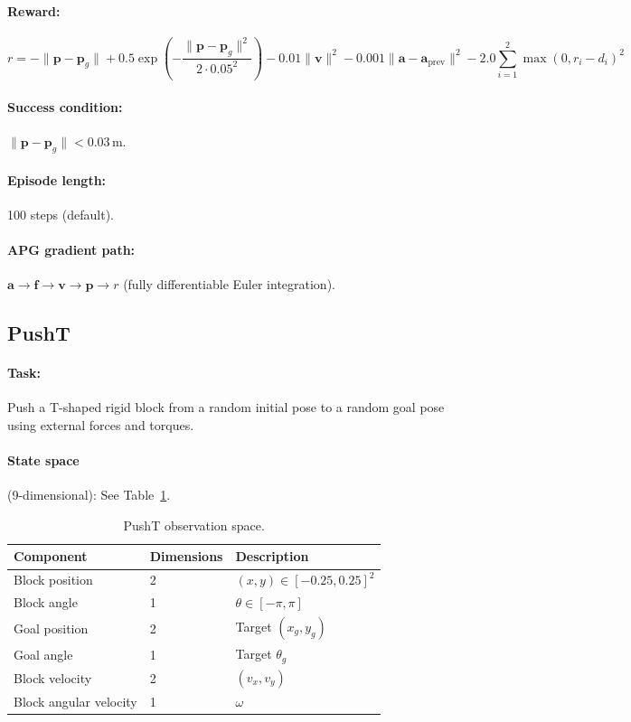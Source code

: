 \documentclass[11pt,a4paper]{article}
\newcommand{\bvf}{\mathbf{v}}
\newcommand{\bpf}{\mathbf{p}}
\newcommand{\bff}{\mathbf{f}}
\newcommand{\ba}{\mathbf{a}}
\begin{document}
\paragraph{Reward:}
\begin{equation}
  r = -\|\bpf - \bpf_g\| + 0.5\exp\!\left(-\frac{\|\bpf - \bpf_g\|^2}{2 \cdot 0.05^2}\right) - 0.01\|\bvf\|^2 - 0.001\|\ba - \ba_{\text{prev}}\|^2 - 2.0 \sum_{i=1}^{2} \max(0, r_i - d_i)^2
  \label{eq:pm_reward}
\end{equation}

\paragraph{Success condition:} $\|\bpf - \bpf_g\| < 0.03$\,m.

\paragraph{Episode length:} 100 steps (default).

\paragraph{APG gradient path:} $\ba \rightarrow \bff \rightarrow \bvf \rightarrow \bpf \rightarrow r$ (fully differentiable Euler integration).

\subsection{PushT}
\label{sec:env_pusht}

\paragraph{Task:} Push a T-shaped rigid block from a random initial pose to a random goal pose using external forces and torques.

\paragraph{State space} (9-dimensional): See Table~\ref{tab:pt_obs}.

\begin{table}[htbp]
  \centering
  \caption{PushT observation space.}
  \label{tab:pt_obs}
  \begin{tabular}{@{}lll@{}}
    \toprule
    \textbf{Component} & \textbf{Dimensions} & \textbf{Description} \\
    \midrule
    Block position        & 2 & $(x, y) \in [-0.25, 0.25]^2$ \\
    Block angle           & 1 & $\theta \in [-\pi, \pi]$ \\
    Goal position         & 2 & Target $(x_g, y_g)$ \\
    Goal angle            & 1 & Target $\theta_g$ \\
    Block velocity        & 2 & $(v_x, v_y)$ \\
    Block angular velocity & 1 & $\omega$ \\
    \bottomrule
  \end{tabular}
\end{table}
\end{document}
